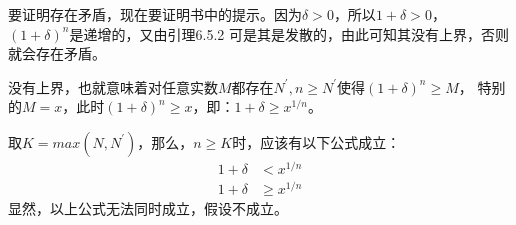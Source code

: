 \documentclass{article}
\theoremstyle{mystyle}
\begin{document}
要证明存在矛盾，现在要证明书中的提示。因为$\delta > 0$，所以$1 + \delta > 0$，
$(1+\delta)^n$是递增的，又由引理6.5.2 可是其是发散的，由此可知其没有上界，否则就会存在矛盾。

没有上界，也就意味着对任意实数$M$都存在$N^\prime, n \geq N^\prime$使得$(1+\delta)^n \geq M$，
特别的$M = x$，此时$(1+\delta)^n \geq x$，即：$1+\delta \geq x^{1/n}$。

取$K = max(N, N^\prime)$，那么，$n \geq K$时，应该有以下公式成立：
\begin{align*}
  1 + \delta & < x^{1/n}    \\
  1+\delta   & \geq x^{1/n}
\end{align*}
显然，以上公式无法同时成立，假设不成立。
\end{document}
